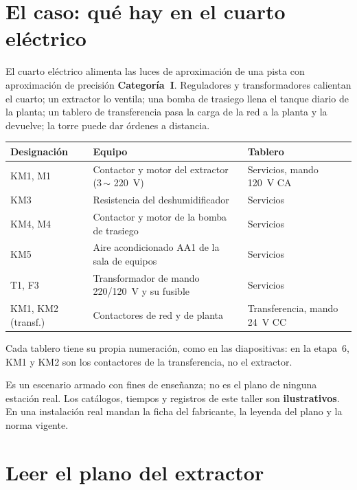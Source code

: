 \documentclass[11pt,a4paper]{article}
\begin{document}
\section*{El caso: qué hay en el cuarto eléctrico}

El cuarto eléctrico alimenta las luces de aproximación de una pista con aproximación de precisión \textbf{Categoría~I}. Reguladores y transformadores calientan el cuarto; un extractor lo ventila; una bomba de trasiego llena el tanque diario de la planta; un tablero de transferencia pasa la carga de la red a la planta y la devuelve; la torre puede dar órdenes a distancia.

\begin{center}\small\renewcommand{\arraystretch}{1.2}
\begin{tabularx}{\linewidth}{@{}l L l@{}}
\toprule
\textbf{Designación} & \textbf{Equipo} & \textbf{Tablero}\\
\midrule
KM1, M1 & Contactor y motor del extractor (3\,$\sim$ \SI{220}{V}) & Servicios, mando \SI{120}{V} CA\\
KM3 & Resistencia del deshumidificador & Servicios\\
KM4, M4 & Contactor y motor de la bomba de trasiego & Servicios\\
KM5 & Aire acondicionado AA1 de la sala de equipos & Servicios\\
T1, F3 & Transformador de mando 220/\SI{120}{V} y su fusible & Servicios\\
KM1, KM2 (transf.) & Contactores de red y de planta & Transferencia, mando \SI{24}{V} CC\\
\bottomrule
\end{tabularx}
\end{center}

Cada tablero tiene su propia numeración, como en las diapositivas: en la etapa~6, KM1 y KM2 son los contactores de la transferencia, no el extractor.

\begin{alerta}
Es un escenario armado con fines de enseñanza; no es el plano de ninguna estación real. Los catálogos, tiempos y registros de este taller son \textbf{ilustrativos}. En una instalación real mandan la ficha del fabricante, la leyenda del plano y la norma vigente.
\end{alerta}

\section{Leer el plano del extractor}
\end{document}
